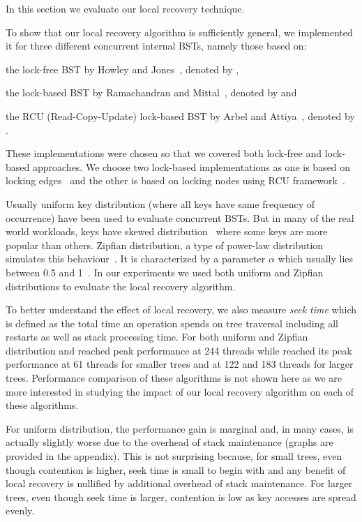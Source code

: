 In this section we evaluate our local recovery technique. 

To show that our local recovery algorithm is sufficiently general, we implemented it for three different concurrent internal BSTs, namely those based on:
\begin{enumerate*}[label=(\roman*)]
\item the lock-free BST by Howley and Jones~\cite{HowJon:2012:SPAA}, denoted by \HJBST{},
\item the lock-based BST by Ramachandran and Mittal~\cite{RamMit:2015:PPoPP}, denoted by \CASTLE{} and
\item the RCU (Read-Copy-Update) lock-based BST by Arbel and Attiya~\cite{ArbAtt:2014:PODC}, denoted by \CITRUS{}.
\end{enumerate*}
These implementations were chosen so that we covered both lock-free and lock-based approaches. We choose two lock-based implementations as one is based on locking edges~\cite{RamMit:2015:PPoPP} and the other is based on locking nodes using RCU framework~\cite{ArbAtt:2014:PODC}.

Usually uniform key distribution (where all keys have same frequency of occurrence) have been used to evaluate concurrent BSTs. But in many of the real world workloads, keys have skewed distribution~\cite{ClaSha+:2009:SIAM} where some keys are more popular than others. Zipfian distribution, a type of power-law distribution simulates this behaviour~\cite{BreCao+:1999:INFOCOM,FalJag:1992:VLDB,GraSun+:1994:SIGMOD}. It is characterized by a parameter $\alpha$ which usually lies between 0.5 and 1~\cite{BreCao+:1999:INFOCOM,AdaHub:2002:GLOTTMET}. In our experiments we used both uniform and Zipfian distributions to evaluate the local recovery algorithm.

To better understand the effect of local recovery, we also measure \emph{seek time} which is defined as the total time an operation spends on tree traversal including all restarts as well as stack processing time. For both uniform and Zipfian distribution \CASTLE{} and \HJBST{} reached peak performance at 244 threads while \CITRUS{} reached its peak performance at 61 threads for smaller trees and at 122 and 183 threads for larger trees. Performance comparison of these algorithms is not shown here as we are more interested in studying the impact of our local recovery algorithm on each of these algorithms. 

For uniform distribution, the performance gain is marginal and, in many cases, is actually slightly worse due to the overhead of stack maintenance (graphs are provided in the appendix). This is not surprising because, for small trees, even though contention is higher, seek time is small to begin with and any benefit of local recovery is nullified by additional overhead of stack maintenance. For larger trees, even though seek time is larger, contention is low as key accesses are spread evenly. 

